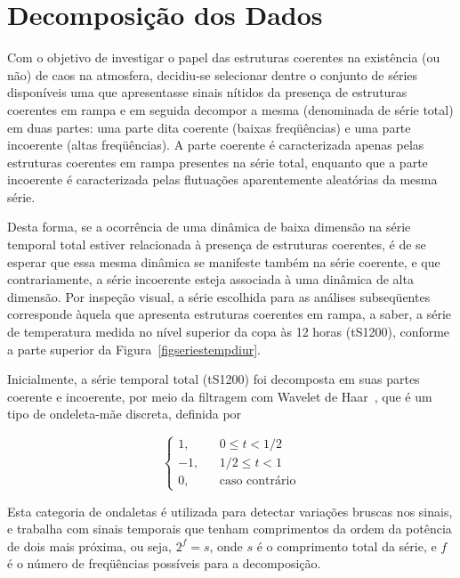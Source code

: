 \section{Decomposição dos Dados}

Com o objetivo de investigar o papel das estruturas coerentes na existência (ou não) de caos na atmosfera, decidiu-se selecionar dentre o conjunto de séries disponíveis uma que apresentasse sinais nítidos da presença de estruturas coerentes em rampa e em seguida decompor a mesma (denominada de série total) em duas partes: uma parte dita coerente (baixas freqüências) e uma parte incoerente (altas freqüências). A parte coerente é caracterizada apenas pelas estruturas coerentes em rampa presentes na série total, enquanto que a parte incoerente é caracterizada pelas flutuações aparentemente aleatórias da mesma série. 

Desta forma, se a ocorrência de uma dinâmica de baixa dimensão na série temporal total estiver relacionada à presença de estruturas coerentes, é de se esperar que essa mesma dinâmica se manifeste também na série coerente, e que contrariamente, a série incoerente esteja associada à uma dinâmica de alta dimensão. Por inspeção visual, a série escolhida para as análises subseqüentes corresponde àquela que apresenta estruturas coerentes em rampa, a saber, a série de temperatura medida no nível superior da copa às 12 horas (tS1200), conforme a parte superior da Figura~\ref{figseriestempdiur}. 


Inicialmente, a série temporal total (tS1200) foi decomposta em suas partes coerente e incoerente, por meio da filtragem com Wavelet de Haar~\cite{katul/94}, que é um tipo de ondeleta-mãe discreta, definida por

\begin{equation}
\left\{ \begin{array}{rrr} 1, &  & 0\leq t < 1/2 \\
                  -1, &  & 1/2\leq t < 1 \\
		   0, &  & \mbox{caso contrário}
\end{array} 
\right.
\label{eqwavelethaar}
\end{equation} 

Esta categoria de ondaletas é utilizada para detectar variações bruscas nos sinais, e trabalha com sinais temporais que tenham comprimentos da ordem da potência de dois mais próxima, ou seja, $2^{f}=s$, onde $s$ é o comprimento total da série, e $f$ é o número de freqüências possíveis para a decomposição. 

